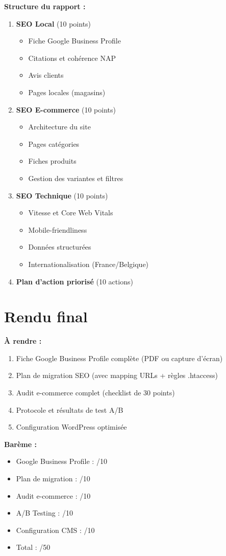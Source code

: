 \documentclass[12pt,a4paper]{report}
\begin{document}
\textbf{Structure du rapport :}

\begin{enumerate}
\item \textbf{SEO Local} (10 points)
   \begin{itemize}
   \item Fiche Google Business Profile
   \item Citations et cohérence NAP
   \item Avis clients
   \item Pages locales (magasins)
   \end{itemize}

\item \textbf{SEO E-commerce} (10 points)
   \begin{itemize}
   \item Architecture du site
   \item Pages catégories
   \item Fiches produits
   \item Gestion des variantes et filtres
   \end{itemize}

\item \textbf{SEO Technique} (10 points)
   \begin{itemize}
   \item Vitesse et Core Web Vitals
   \item Mobile-friendliness
   \item Données structurées
   \item Internationalisation (France/Belgique)
   \end{itemize}

\item \textbf{Plan d'action priorisé} (10 actions)
\end{enumerate}

\section{Rendu final}

\textbf{À rendre :}
\begin{enumerate}
\item Fiche Google Business Profile complète (PDF ou capture d'écran)
\item Plan de migration SEO (avec mapping URLs + règles .htaccess)
\item Audit e-commerce complet (checklist de 30 points)
\item Protocole et résultats de test A/B
\item Configuration WordPress optimisée
\end{enumerate}

\textbf{Barème :}
\begin{itemize}
\item Google Business Profile : /10
\item Plan de migration : /10
\item Audit e-commerce : /10
\item A/B Testing : /10
\item Configuration CMS : /10
\item Total : /50
\end{itemize}
\end{document}
